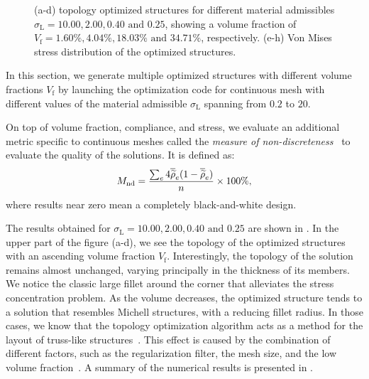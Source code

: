\begin{figure}[]
    \hfill
    \hfill
    \caption{(a-d) topology optimized structures for different material admissibles $\sigma_\text{L}=10.00,2.00,0.40\text{ and }0.25$, showing a volume fraction of $V_\text{f}=1.60\%,4.04\%,18.03\%\text{ and }34.71\%$, respectively. (e-h) Von Mises stress distribution of the optimized structures.}
    \label{fig:03_to_sol}
\end{figure}
In this section, we generate multiple optimized structures with different volume fractions $V_\text{f}$ by launching the optimization code for continuous mesh with different values of the material admissible $\sigma_\text{L}$ spanning from $0.2$ to $20$.

On top of volume fraction, compliance, and stress, we evaluate an additional metric specific to continuous meshes called the \textit{measure of non-discreteness}~ to evaluate the quality of the solutions. It is defined as:
\begin{equation}
    M_\text{nd} = \frac{\sum_e 4 \overline{\widetilde{\rho}}_e(1-\overline{\widetilde{\rho}}_e)}{n} \times 100 \%,
\end{equation}
where results near zero mean a completely black-and-white design. 

The results obtained for $\sigma_\text{L}=10.00,2.00,0.40\text{ and }0.25$ are shown in . In the upper part of the figure (a-d), we see the topology of the optimized structures with an ascending volume fraction $V_\text{f}$. Interestingly, the topology of the solution remains almost unchanged, varying principally in the thickness of its members. We notice the classic large fillet around the corner that alleviates the stress concentration problem. As the volume decreases, the optimized structure tends to a solution that resembles Michell structures, with a reducing fillet radius. In those cases, we know that the topology optimization algorithm acts as a method for the layout of truss-like structures~. This effect is caused by the combination of different factors, such as the regularization filter, the mesh size, and the low volume fraction~. A summary of the numerical results is presented in .

